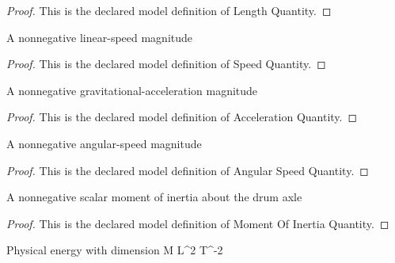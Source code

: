 \begin{proof}
  This is the declared model definition of Length Quantity.
\end{proof}
\begin{definition}
  \label{def:physics:phyx-mini-0773:phyxminiproblems-problemphyxmini0773-speedquantity}
  A nonnegative linear-speed magnitude
\end{definition}
\begin{proof}
  This is the declared model definition of Speed Quantity.
\end{proof}
\begin{definition}
  \label{def:physics:phyx-mini-0773:phyxminiproblems-problemphyxmini0773-accelerationquantity}
  A nonnegative gravitational-acceleration magnitude
\end{definition}
\begin{proof}
  This is the declared model definition of Acceleration Quantity.
\end{proof}
\begin{definition}
  \label{def:physics:phyx-mini-0773:phyxminiproblems-problemphyxmini0773-angularspeedquantity}
  A nonnegative angular-speed magnitude
\end{definition}
\begin{proof}
  This is the declared model definition of Angular Speed Quantity.
\end{proof}
\begin{definition}
  \label{def:physics:phyx-mini-0773:phyxminiproblems-problemphyxmini0773-momentofinertiaquantity}
  A nonnegative scalar moment of inertia about the drum axle
\end{definition}
\begin{proof}
  This is the declared model definition of Moment Of Inertia Quantity.
\end{proof}
\begin{definition}
  \label{def:physics:phyx-mini-0773:phyxminiproblems-problemphyxmini0773-energyquantity}
  Physical energy with dimension M L\textasciicircum{}2 T\textasciicircum{}-2
\end{definition}
